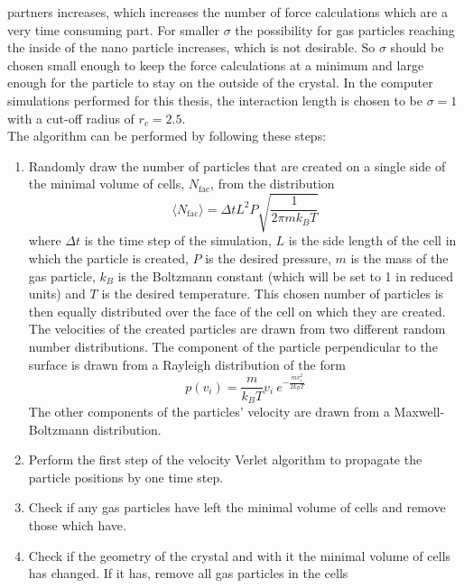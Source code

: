 \documentclass[12pt]{article}
\begin{document}
partners increases, which increases the number of force calculations which are a very time consuming part. For smaller $\sigma$ the possibility for
gas particles reaching the inside of the nano particle increases, which is not desirable. So $\sigma$ should be chosen small enough to keep the force
calculations at a minimum and large enough for the particle to stay on the outside of the crystal. In the computer simulations performed for this
thesis, the interaction length is chosen to be $\sigma = 1$ with a cut-off radius of $r_c = 2.5$.\\ 
The algorithm can be performed by following these steps:
\begin{enumerate}
    \item Randomly draw the number of particles that are created on a single side of the minimal volume of cells, $N_\text{fac}$, from the
        distribution 
        \begin{equation}
            \label{eq:numberofparticles}
            \langle N_\text{fac}\rangle = \Delta t L^2 P \sqrt{\frac{1}{2\pi m k_B T}}
        \end{equation}
        where $\Delta t$ is the time step of the simulation, $L$ is the side length of the cell in which the particle is created, $P$ is the desired
        pressure, $m$ is the mass of the gas particle, $k_B$ is the Boltzmann constant (which will be set to 1 in reduced units) and $T$ is the
        desired temperature. This chosen number of particles is then equally distributed over the face of the cell on which they are created. The
        velocities of the created particles are drawn from two different random number distributions. The component of the particle perpendicular to
        the surface is drawn from a Rayleigh distribution of the form 
        \begin{equation}
            p(v_i) = \frac{m}{k_B T}v_i \ e^{-\frac{mv_i^2}{2k_BT}}
        \end{equation}
        The other components of the particles' velocity are drawn from a Maxwell-Boltzmann distribution.
    \item Perform the first step of the velocity Verlet algorithm to propagate the particle positions by one time step.
    \item Check if any gas particles have left the minimal volume of cells and remove those which have.
    \item Check if the geometry of the crystal and with it the minimal volume of cells has changed. If it has, remove all gas particles in the cells

\end{enumerate}
\end{document}
